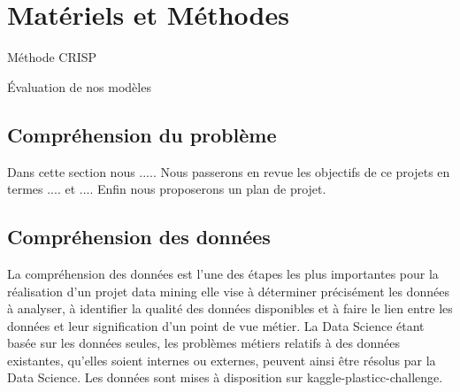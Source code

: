 \chapter{Matériels et Méthodes}

Méthode CRISP\cite{crisp}

Évaluation de nos modèles \cite{plasticc_team_2019_2539456}

\section{Compréhension du problème}

Dans cette section nous .....
Nous passerons en revue les objectifs de ce projets en termes .... et ....
Enfin nous proposerons un plan de projet.


\section{Compréhension des données}
La compréhension des données est l’une des étapes les plus importantes pour la réalisation d’un projet data mining elle vise à déterminer précisément les données à analyser, à identifier la qualité des données disponibles et à faire le lien entre les données
et leur signification d’un point de vue métier. La Data Science étant basée sur les données seules, les problèmes métiers relatifs à des données existantes, qu’elles soient internes ou externes, peuvent ainsi être résolus par la Data Science. Les données sont mises à
disposition sur kaggle-plasticc-challenge.

